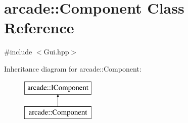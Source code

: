 \hypertarget{classarcade_1_1_component}{\section{arcade\-:\-:Component Class Reference}
\label{classarcade_1_1_component}
}


{\ttfamily \#include $<$Gui.\-hpp$>$}

Inheritance diagram for arcade\-:\-:Component\-:\begin{figure}[H]
\begin{center}
\leavevmode
\includegraphics[height=2.000000cm]{classarcade_1_1_component}
\end{center}
\end{figure}

